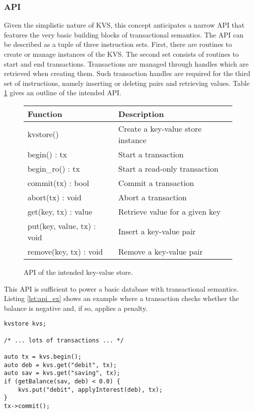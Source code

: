 \subsubsection{API}

Given the simplistic nature of \ac{KVS}, this concept anticipates a narrow
\ac{API} that features the very basic building blocks of transactional
semantics. The \ac{API} can be described as a tuple of three instruction sets.
First, there are routines to create or manage instances of the \ac{KVS}. The
second set consists of routines to start and end transactions. Transactions are
managed through handles which are retrieved when creating them. Such transaction
handles are required for the third set of instructions, namely inserting or
deleting pairs and retrieving values. Table \ref{tab:api} gives an outline of
the intended \ac{API}.

\begin{figure}[!h]
    \centering
    \begin{tabular}{|l|l|}
        \hline
        \textbf{Function}          & \textbf{Description} \\
        \hline
        kvstore()                  & Create a key-value store instance \\
        begin() : tx               & Start a transaction \\
        begin\_ro() : tx            & Start a read-only transaction \\
        commit(tx) : bool          & Commit a transaction \\
        abort(tx) : void           & Abort a transaction \\
        get(key, tx) : value       & Retrieve value for a given key \\
        put(key, value, tx) : void & Insert a key-value pair \\
        remove(key, tx) : void     & Remove a key-value pair \\
        \hline
    \end{tabular}
    \caption{API of the intended key-value store.}
    \label{tab:api}
\end{figure}

This \ac{API} is sufficient to power a basic database with transactional
semantics. Listing \ref{lst:api_ex} shows an example where a transaction checks
whether the balance is negative and, if so, applies a penalty.

\begin{lstlisting}[caption={}, captionpos=b, label=lst:api_ex]
kvstore kvs;

/* ... lots of transactions ... */

auto tx = kvs.begin();
auto deb = kvs.get("debit", tx);
auto sav = kvs.get("saving", tx);
if (getBalance(sav, deb) < 0.0) {
	kvs.put("debit", applyInterest(deb), tx);
}
tx->commit();
\end{lstlisting}



